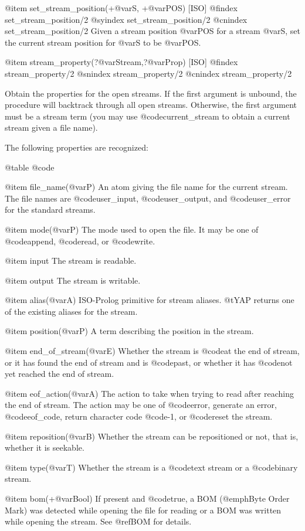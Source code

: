 {{{{{@item set_stream_position(+@var{S}, +@var{POS}) [ISO]
@findex set_stream_position/2
@syindex set_stream_position/2
@cnindex set_stream_position/2
Given a stream position @var{POS} for a stream @var{S}, set the current
stream position for @var{S} to be @var{POS}.

@item stream_property(?@var{Stream},?@var{Prop}) [ISO]
@findex stream_property/2
@snindex stream_property/2
@cnindex stream_property/2

Obtain the properties for the open streams. If the first argument is
unbound, the procedure will backtrack through all open
streams. Otherwise, the first argument must be a stream term (you may
use @code{current_stream} to obtain a current stream given a file name).

The following properties are recognized:

@table @code

@item file_name(@var{P})
An atom giving the file name for the current stream. The file names are
@code{user_input}, @code{user_output}, and @code{user_error} for the
standard streams.

@item mode(@var{P})
The mode used to open the file. It may be one of @code{append},
@code{read}, or @code{write}.

@item input
The stream is readable.

@item output
The stream is writable.

@item alias(@var{A})
ISO-Prolog primitive for stream aliases. @t{YAP} returns one of the
existing aliases for the stream.

@item position(@var{P})
A term describing the position in the stream.

@item end_of_stream(@var{E})
Whether the stream is @code{at} the end of stream, or it has found the
end of stream and is @code{past}, or whether it has @code{not} yet
reached the end of stream.

@item eof_action(@var{A})
The action to take when trying to read after reaching the end of
stream. The action may be one of @code{error}, generate an error,
@code{eof_code}, return character code @code{-1}, or @code{reset} the
stream.

@item reposition(@var{B})
Whether the stream can be repositioned or not, that is, whether it is
seekable.

@item type(@var{T})
Whether the stream is a @code{text} stream or a @code{binary} stream.

@item bom(+@var{Bool})
If present and @code{true}, a BOM (@emph{Byte Order Mark}) was
detected while opening the file for reading or a BOM was written while
opening the stream. See @ref{BOM} for details.

}}}}}
